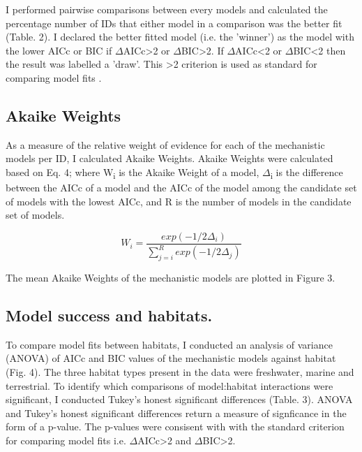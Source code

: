 \documentclass[11pt]{article}
\begin{document}
            I performed pairwise comparisons between every models and calculated the percentage number of IDs that either model in a comparison was the better fit (Table. 2). I declared the better fitted model (i.e. the 'winner') as the model with the lower AICc or BIC if $\Delta$AICc\textgreater2 or $\Delta$BIC\textgreater2. If $\Delta$AICc\textless2 or $\Delta$BIC\textless2 then the result was labelled a 'draw'. This \textgreater2 criterion is used as standard for comparing model fits \citep{johnson2004model}.
            
        \subsection{Akaike Weights}
            As a measure of the relative weight of evidence for each of the mechanistic models per ID, I calculated Akaike Weights. Akaike Weights were calculated based on Eq. 4; where W\textsubscript{i} is the Akaike Weight of a model, $\Delta$\textsubscript{i} is the difference between the AICc of a model and the AICc of the model among the candidate set of models with the lowest AICc, and R is the number of models in the candidate set of models.
            
            \begin{equation}
                W_i = \frac{exp(-1/2 \Delta_i)}{\sum\limits_{j=i}^{R} exp(-1/2\Delta_j)}
            \end{equation}

            The mean Akaike Weights of the mechanistic models are plotted in Figure 3.

        \subsection{Model success and habitats.}
            To compare model fits between habitats, I conducted an analysis of variance (ANOVA) of AICc and BIC values of the mechanistic models against habitat (Fig. 4). The three habitat types present in the data were freshwater, marine and terrestrial. To identify which comparisons of model:habitat interactions were significant, I conducted Tukey's honest significant differences (Table. 3). ANOVA and Tukey's honest significant differences return a measure of signficance in the form of a p-value. The p-values were consisent with with the standard criterion for comparing model fits i.e. $\Delta$AICc\textgreater2 and $\Delta$BIC\textgreater2.
\end{document}
